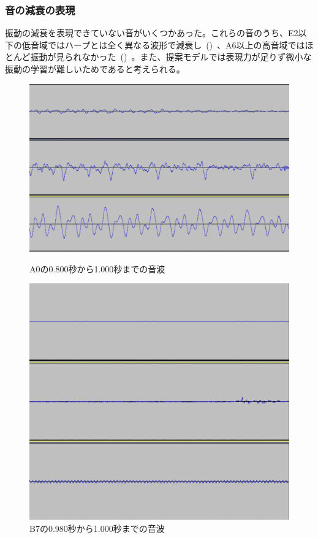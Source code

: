 \clearpage

\subsubsection{音の減衰の表現}

振動の減衰を表現できていない音がいくつかあった。これらの音のうち、E2以下の低音域ではハープとは全く異なる波形で減衰し~()~、A6以上の高音域ではほとんど振動が見られなかった~()~。また、提案モデルでは表現力が足りず微小な振動の学習が難しいためであると考えられる。

\begin{figure}[b]
\centering
\begin{minipage}{0.48\columnwidth}
\centering
\includegraphics[width=0.85\columnwidth]{figure/88_88_det/a0_0800_1000.png}
\caption[A0の音波]{A0の0.800秒から1.000秒までの音波}
\label{fig:88_88_reduce1}
\end{minipage}
\begin{minipage}{0.48\columnwidth}
\centering
\includegraphics[width=0.75\columnwidth]{figure/88_88_det/b7_0980_1000.png}
\caption[B7の音波]{B7の0.980秒から1.000秒までの音波}
\label{fig:88_88_reduce2}
\end{minipage}
\end{figure}

